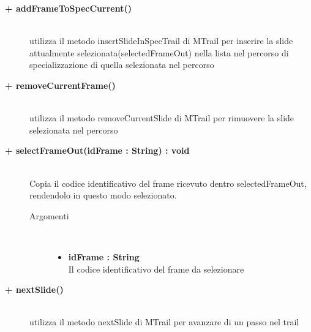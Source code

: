 \begin{description}
	\begin{description}
		\item[\textbf{\color{blue}+ addFrameToSpecCurrent()			}] \hfill \\
			utilizza il metodo insertSlideInSpecTrail di MTrail per inserire la slide attualmente selezionata(selectedFrameOut) nella lista nel percorso di specializzazione di quella selezionata nel percorso
	\end{description}
	
	\begin{description}
		\item[\textbf{\color{blue}+ removeCurrentFrame()			}] \hfill \\
			utilizza il metodo removeCurrentSlide di MTrail per rimuovere la slide selezionata nel percorso
	\end{description}
	
	\begin{description}
		\item[\textbf{\color{blue}+ selectFrameOut(idFrame : String) : void			}] \hfill \\
			Copia il codice identificativo del frame ricevuto dentro selectedFrameOut, rendendolo in questo modo selezionato.
			
		\begin{description}
			\item[Argomenti] \hfill \\
				\begin{itemize}
				
					\item \textbf{idFrame : String			} \hfill \\
					Il codice identificativo del frame da selezionare
					
				\end{itemize}
			
		\end{description}
	\end{description}
	
	\begin{description}
		\item[\textbf{\color{blue}+ nextSlide()			}] \hfill \\
			utilizza il metodo nextSlide di MTrail per avanzare di un passo nel trail
	\end{description}
	

\end{description}
